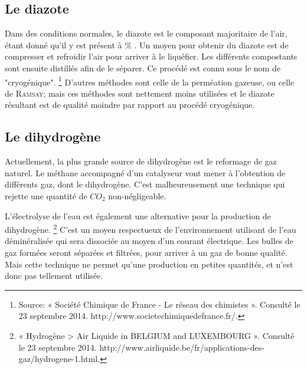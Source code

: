\documentclass[11pt,a4paper]{report}
\begin{document}
\subsection*{Le diazote}
Dans des conditions normales, le diazote est le composant majoritaire de l'air, étant donné qu'il y est présent à 
 \% . Un moyen pour obtenir du diazote est de compresser et refroidir l'air pour arriver à le liquéfier.
Les différents compostants sont ensuite distillés afin de le séparer. Ce procédé est connu sous le nom de "cryogénique".
\footnote{Source: « Société Chimique de France - Le réseau des chimistes ». Consulté le 23 septembre 2014. http://www.societechimiquedefrance.fr/.}
D'autres méthodes sont celle de la perméation gazeuse, ou celle de \textsc{Ramsay}; mais ces méthodes sont nettement moins utilisées
et le diazote résultant est de qualité moindre par rapport au procédé cryogénique.
\subsection*{Le dihydrogène}
Actuellement, la plus grande source de dihydrogène est le reformage de gaz naturel. Le méthane accompagné d'un 
catalyseur vont mener à l'obtention de différents gaz, dont le dihydrogène. C'est malheureusement une technique
qui rejette une quantité de $CO_2$ non-négligeable.

L'électrolyse de l'eau est également une alternative pour la production de dihydrogène. \footnote{« Hydrogène > Air Liquide in BELGIUM and LUXEMBOURG ». Consulté le 23 septembre 2014. http://www.airliquide.be/fr/applications-des-gaz/hydrogene-1.html.}
C'est un moyen respectueux de l'environnement utilisant de l'eau déminéralisée qui sera dissociée au moyen 
d'un courant électrique. Les bulles de gaz formées seront séparées et filtrées, pour arriver à un gaz de bonne qualité.
Mais cette technique ne permet qu'une production en petites quantités, et n'est donc pas tellement utilisée.
\end{document}
